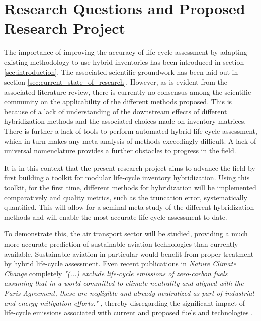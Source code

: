 \documentclass{article}
\begin{document}
    
        
        
    
\section{Research Questions and Proposed Research Project}
    
    The importance of improving the accuracy of life-cycle assessment by adapting existing methodology to use hybrid inventories has been introduced in section \ref{sec:introduction}. The associated scientific groundwork has been laid out in section \ref{sec:current_state_of_research}. However, as is evident from the associated literature review, there is currently no consensus among the scientific community on the applicability of the different methods proposed. This is because of a lack of understanding of the downstream effects of different hybridization methods and the associated choices made on inventory matrices. There is further a lack of tools to perform automated hybrid life-cycle assessment, which in turn makes any meta-analysis of methods exceedingly difficult. A lack of universal nomenclature provides a further obstacles to progress in the field. 
    
    It is in this context that the present research project aims to advance the field by first building a toolkit for modular life-cycle inventory hybridization. Using this toolkit, for the first time, different methods for hybridization will be implemented comparatively and quality metrics, such as the truncation error, systematically quantified. This will allow for a seminal meta-study of the different hybridization methods and will enable the most accurate life-cycle assessment to-date.
    
    To demonstrate this, the air transport sector will be studied, providing a much more accurate prediction of sustainable aviation technologies than currently available. Sustainable aviation in particular would benefit from proper treatment by hybrid life-cycle assessment. Even recent publications in \textit{Nature Climate Change} completely \textit{"(...) exclude life-cycle emissions of zero-carbon fuels assuming that in a world committed to climate neutrality and aligned with the Paris Agreement, these are negligible and already neutralized as part of industrial and energy mitigation efforts."} \cite{brazzola_definitions_2022}, thereby disregarding the significant impact of life-cycle emissions associated with current and proposed fuels and technologies \cite{prussi_corsia_2021}.
    
\end{document}
